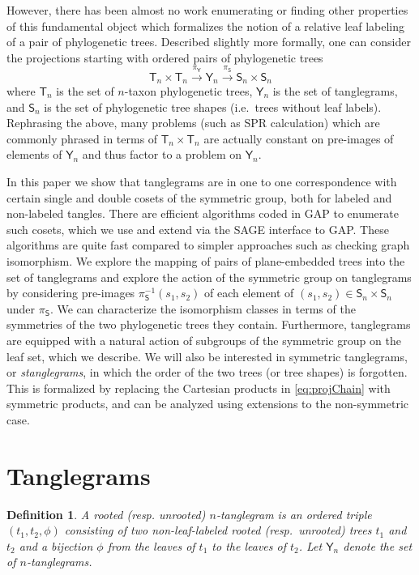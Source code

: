 \documentclass{amsart}
\newtheorem{definition}{Definition}
\newcommand{\tree}{\mathsf{T}}
\newcommand{\shape}{\mathsf{S}}
\newcommand{\tangle}{\mathsf{Y}}
\begin{document}
However, there has been almost no work enumerating or finding other properties of this fundamental object which formalizes the notion of a relative leaf labeling of a pair of phylogenetic trees.
Described slightly more formally, one can consider the projections starting with ordered pairs of phylogenetic trees
\begin{equation}
\label{eq:projChain}
\tree_n \times \tree_n \xrightarrow{\pi_\tangle} \tangle_n \xrightarrow{\pi_\shape} \shape_n \times \shape_n
\end{equation}
where $\tree_n$ is the set of $n$-taxon phylogenetic trees, $\tangle_n$ is the set of tanglegrams, and $\shape_n$ is the set of phylogenetic tree shapes (i.e.\ trees without leaf labels).
Rephrasing the above, many problems (such as SPR calculation) which are commonly phrased in terms of $\tree_n \times \tree_n$ are actually constant on pre-images of elements of $\tangle_n$ and thus factor to a problem on $\tangle_n$.

In this paper we show that tanglegrams are in one to one correspondence with certain single and double cosets of the symmetric group, both for labeled and non-labeled tangles.
There are efficient algorithms coded in GAP \cite{GAP4} to enumerate such cosets, which we use and extend via the SAGE \cite{SteinJoyner2005} interface to GAP.
These algorithms are quite fast compared to simpler approaches such as checking graph isomorphism.
We explore the mapping of pairs of plane-embedded trees into the set of tanglegrams and explore the action of the symmetric group on tanglegrams by considering pre-images $\pi_\shape^{-1}(s_1, s_2)$ of each element of $(s_1, s_2) \in \shape_n \times \shape_n$ under $\pi_\shape$.
We can characterize the isomorphism classes in terms of the symmetries of the two phylogenetic trees they contain.
Furthermore, tanglegrams are equipped with a natural action of subgroups of the symmetric group on the leaf set, which we describe.
We will also be interested in symmetric tanglegrams, or \emph{stanglegrams}, in which the order of the two trees (or tree shapes) is forgotten.
This is formalized by replacing the Cartesian products in \eqref{eq:projChain} with symmetric products, and can be analyzed using extensions to the non-symmetric case.


\section{Tanglegrams}
\begin{definition}
\label{def:tanglegram}
A rooted (resp. unrooted) $n$-\emph{tanglegram} is an ordered triple $(t_1, t_2, \phi)$ consisting of two non-leaf-labeled rooted (resp.\ unrooted) trees $t_1$ and $t_2$ and a bijection $\phi$ from the leaves of $t_1$ to the leaves of $t_2$.
Let $\tangle_n$ denote the set of $n$-tanglegrams.
\end{definition}
\end{document}
